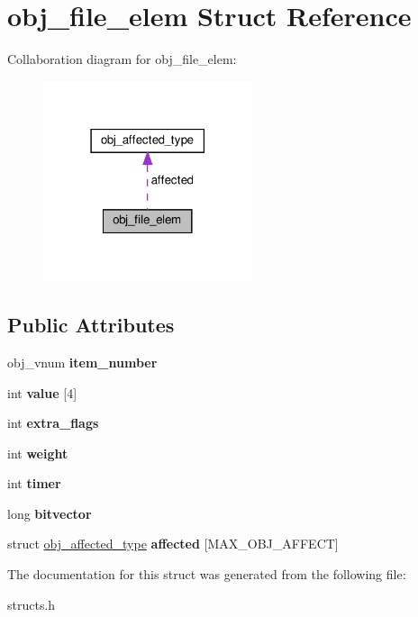 \hypertarget{structobj__file__elem}{}\section{obj\+\_\+file\+\_\+elem Struct Reference}
\label{structobj__file__elem}


Collaboration diagram for obj\+\_\+file\+\_\+elem\+:\nopagebreak
\begin{figure}[H]
\begin{center}
\leavevmode
\includegraphics[width=174pt]{structobj__file__elem__coll__graph}
\end{center}
\end{figure}
\subsection*{Public Attributes}
\begin{DoxyCompactItemize}
\item 
\mbox{\label{structobj__file__elem_a8d9169c18ed7b6508b126657cbc19884}} 
obj\+\_\+vnum {\bfseries item\+\_\+number}
\item 
\mbox{\label{structobj__file__elem_af87dd81fe64f9ea1332e720f497185b3}} 
int {\bfseries value} \mbox{[}4\mbox{]}
\item 
\mbox{\label{structobj__file__elem_ad44004f327e4502b17483e5501554bff}} 
int {\bfseries extra\+\_\+flags}
\item 
\mbox{\label{structobj__file__elem_a682a8a10682c730924f86f0d55e0cda4}} 
int {\bfseries weight}
\item 
\mbox{\label{structobj__file__elem_a9e7444dc2029cb77c79b8332c99b31a5}} 
int {\bfseries timer}
\item 
\mbox{\label{structobj__file__elem_a08aeb39579a58670822fdf6108b45f4f}} 
long {\bfseries bitvector}
\item 
\mbox{\label{structobj__file__elem_a9a53825c64ff6a5e16519f94ad383851}} 
struct \hyperlink{structobj__affected__type}{obj\+\_\+affected\+\_\+type} {\bfseries affected} \mbox{[}M\+A\+X\+\_\+\+O\+B\+J\+\_\+\+A\+F\+F\+E\+CT\mbox{]}
\end{DoxyCompactItemize}


The documentation for this struct was generated from the following file\+:\begin{DoxyCompactItemize}
\item 
structs.\+h\end{DoxyCompactItemize}
